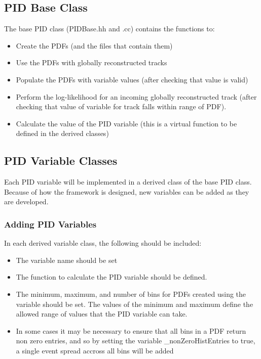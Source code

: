 \documentclass[a4paper,12pt]{article}
\begin{document}
\subsection{PID Base Class}
\label{PIDBase}
The base PID class (PIDBase.hh and .cc) contains the functions to:
\begin{itemize}
\item Create the PDFs (and the files that contain them)
\item Use the PDFs with globally reconstructed tracks
\item Populate the PDFs with variable values (after checking that 
value is valid)
\item Perform the log-likelihood for an incoming globally reconstructed 
track (after checking that value of variable for track falls within 
range of PDF).
\item Calculate the value of the PID variable (this is a virtual 
function to be defined in the derived classes)
\end{itemize}

\subsection{PID Variable Classes}
\label{PIDVar}
Each PID variable will be implemented in a derived class of the base PID class. Because of how the framework is designed, new variables can be added as they are developed.

\subsubsection{Adding PID Variables}
\label{addvar}
In each derived variable class, the following should be included:
\begin{itemize}
\item The variable name should be set
\item The function to calculate the PID variable should be defined.  
\item The minimum, maximum, and number of bins for PDFs created using 
the variable should be set. The values of the minimum and maximum 
define the allowed range of values that the PID variable can take.
\item In some cases it may be necessary to ensure that all bins in a 
PDF return non zero entries, and so by setting the variable 
\_nonZeroHistEntries to true, a single event spread accross all bins 
will be added
\end{itemize}
\end{document}
